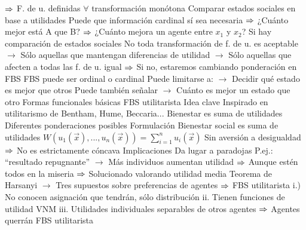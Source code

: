 \documentclass{nuevotema}
\begin{document}
\begin{esquemal}
				\4[] $\Rightarrow$ F. de u. definidas $\forall$ transformación monótona
				\4 Comparar estados sociales en base a utilidades
				\4[] Puede que información cardinal sí sea necesaria
				\4[] $\Rightarrow$ ¿Cuánto mejor está A que B?
				\4[] $\Rightarrow$ ¿Cuánto mejora un agente entre $x_1$ y $x_2$?
				\4 Si hay comparación de estados sociales
				\4[] No toda transformación de f. de u. es aceptable
				\4[] $\to$ Sólo aquellas que mantengan diferencias de utilidad
				\4[] $\to$ Sólo aquellas que afecten a todas las f. de u. igual
				\4[] $\Rightarrow$ Si no, estaremos cambiando ponderación en FBS
				\4 FBS puede ser ordinal o cardinal
				\4[] Puede limitarse a:
				\4[] $\to$ Decidir qué estado es mejor que otros
				\4[] Puede también señalar
				\4[] $\to$ Cuánto es mejor un estado que otro
		\2 Formas funcionales básicas
			\3 FBS utilitarista
				\4 Idea clave
				\4[] Inspirado en utilitarismo de Bentham, Hume, Beccaria...
				\4[] Bienestar es suma de utilidades
				\4[] Diferentes ponderaciones posibles
				\4 Formulación
				\4[] Bienestar social es suma de utilidades
				\4[] $W(u_1(\vec{x}), ..., u_n(\vec{x})) =  \sum_{i=1}^n u_i(\vec{x})$
				\4[] 
				\4[] Sin aversión a desigualdad
				\4[] $\Rightarrow$ No es estrictamente cóncava
				\4 Implicaciones
				\4 Da lugar a paradojas
				\4[] P.ej.:
				\4[] ``resultado repugnante''
				\4[] $\to$ Más individuos aumentan utilidad
				\4[] $\Rightarrow$ Aunque estén todos en la miseria
				\4[] $\Rightarrow$ Solucionado valorando utilidad media
				\4[] Teorema de Harsanyi
				\4[] $\to$ Tres supuestos sobre preferencias de agentes
				\4[] $\Rightarrow$ FBS utilitarista
				\4[] i.) No conocen asignación que tendrán, sólo distribución
				\4[] ii. Tienen funciones de utilidad VNM
				\4[] iii. Utilidades individuales separables de otros agentes
				\4[] $\Rightarrow$ Agentes querrán FBS utilitarista



\end{esquemal}
\end{document}
